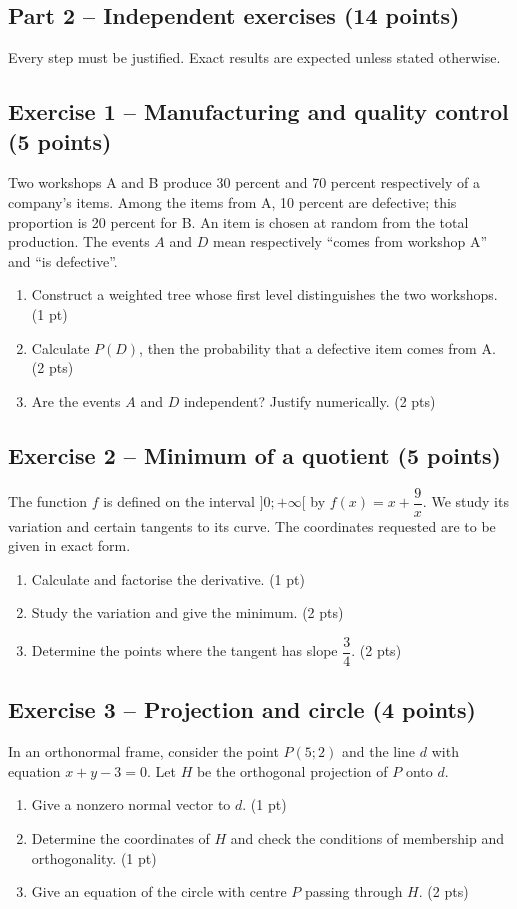 \clearpage\subsection*{Part 2 -- Independent exercises (14 points)}
Every step must be justified. Exact results are expected unless stated otherwise.
\subsection*{Exercise 1 -- Manufacturing and quality control (5 points)}
Two workshops A and B produce 30 percent and 70 percent respectively of a company's items. Among the items from A, 10 percent are defective; this proportion is 20 percent for B. An item is chosen at random from the total production. The events $A$ and $D$ mean respectively ``comes from workshop A'' and ``is defective''.
\begin{enumerate}
\item Construct a weighted tree whose first level distinguishes the two workshops. \hfill(1 pt)
\item Calculate $P(D)$, then the probability that a defective item comes from A. \hfill(2 pts)
\item Are the events $A$ and $D$ independent? Justify numerically. \hfill(2 pts)
\end{enumerate}
\subsection*{Exercise 2 -- Minimum of a quotient (5 points)}
The function $f$ is defined on the interval $]0;+\infty[$ by $f(x)=x+\dfrac9x$. We study its variation and certain tangents to its curve. The coordinates requested are to be given in exact form.
\begin{enumerate}
\item Calculate and factorise the derivative. \hfill(1 pt)
\item Study the variation and give the minimum. \hfill(2 pts)
\item Determine the points where the tangent has slope $\dfrac{3}{4}$. \hfill(2 pts)
\end{enumerate}
\subsection*{Exercise 3 -- Projection and circle (4 points)}
In an orthonormal frame, consider the point $P(5;2)$ and the line $d$ with equation $x+y-3=0$. Let $H$ be the orthogonal projection of $P$ onto $d$.
\begin{enumerate}
\item Give a nonzero normal vector to $d$. \hfill(1 pt)
\item Determine the coordinates of $H$ and check the conditions of membership and orthogonality. \hfill(1 pt)
\item Give an equation of the circle with centre $P$ passing through $H$. \hfill(2 pts)
\end{enumerate}
